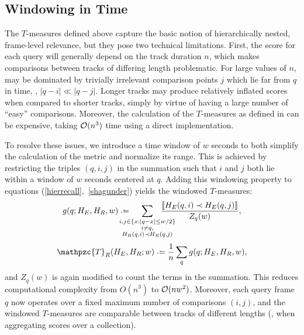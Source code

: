 \documentclass{article}
\def\shag{\ensuremath{\mathpzc{T}}}
\begin{document}

\subsection{Windowing in Time}
\label{sec:window}

The $T$-measures defined above capture the basic notion of hierarchically nested, frame-level relevance, but they pose two technical limitations.
First, the score for each query will generally depend on the track duration $n$, which makes comparisons between tracks of differing length problematic.  
For large values of $n$,  may be dominated by trivially irrelevant comparison points $j$ which lie far from $q$ in time, \ie, $|q-i| \ll |q-j|$.
Longer tracks may produce relatively inflated scores when compared to shorter tracks, simply by virtue of having a large number of ``easy'' comparisons.
Moreover, the calculation of the $T$-measures as defined in  can be expensive, taking
$\mathcal{O}(n^3)$ time using a direct implementation.

To resolve these issues, we introduce a time window of $w$ seconds to both simplify the 
calculation of the metric and normalize its range.  This is achieved by
restricting the triples $(q,i,j)$ in the summation such that $i$ and $j$ both lie within
a window of $w$ seconds centered at $q$.
Adding this windowing property to equations (\ref{hierrecall},~\ref{shagunder}) yields the windowed $T$-measures:
\begin{equation}
    g(q ; H_E, H_R, w) \defeq \hspace{-1.5em} \sum_{\substack{
        i, j \in \{x : |q-x| \leq w/2\}\\ 
  i \neq q,\\
  H_R(q, i) \prec H_R(q, j) }}
  \hspace{-2em} \frac{\ind{H_E(q, i) \prec H_E(q,
  j)}}{Z_q(w)},\label{windowrecall}
\end{equation}
\begin{equation}
\shag_R(H_E, H_R ; w) \defeq \frac{1}{n} \sum_q g(q ; H_E, H_R, w),
\end{equation}
and $Z_q(w)$ is again modified to count the terms in the summation.
This reduces computational complexity from $O(n^3)$ to $\mathcal{O}(nw^2)$.
Moreover, each query frame $q$ now operates over a fixed maximum number of comparisons
$(i, j)$, and the windowed $T$-measures are comparable between tracks of different lengths (\eg, when
aggregating scores over a collection).
\end{document}
